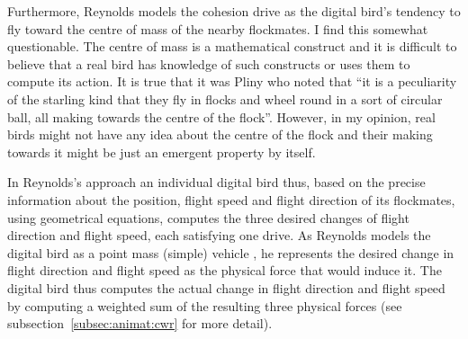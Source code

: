 Furthermore, Reynolds models the cohesion drive as the digital bird's tendency to fly toward the centre of mass of the nearby flockmates. I find this somewhat questionable. The centre of mass is a mathematical construct and it is difficult to believe that a real bird has knowledge of such constructs or uses them to compute its action. It is true that it was Pliny \cite{heppner:1997} who noted that ``it is a peculiarity of the starling kind that they fly in flocks and wheel round in a sort of circular ball, all making towards the centre of the flock''. However, in my opinion, real birds might not have any idea about the centre of the flock and their making towards it might be just an emergent property by itself.

In Reynolds's approach an individual digital bird thus, based on the precise information about the position, flight speed and flight direction of its flockmates, using geometrical equations, computes the three desired changes of flight direction and flight speed, each satisfying one drive. As Reynolds models the digital bird as a point mass (simple) vehicle \cite{reynolds:1987,reynolds:1999}, he represents the desired change in flight direction and flight speed as the physical force that would induce it. The digital bird thus computes the actual change in flight direction and flight speed by computing a weighted sum of the resulting three physical forces (see subsection~\ref{subsec:animat:cwr} for more detail).

